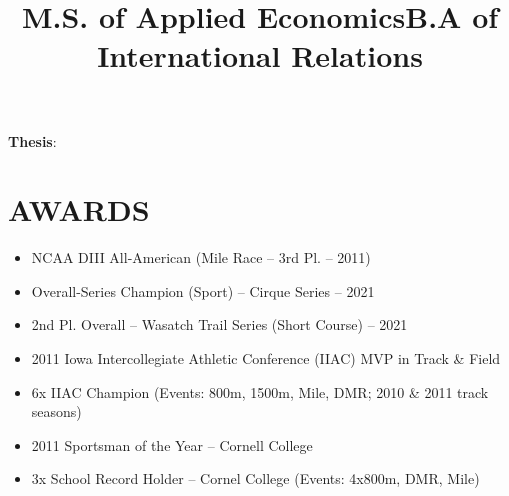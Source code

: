 \documentclass[resmargin, centered, 10pt]{../res}
\begin{document}
\begin{resume}
\title{M.S. of Applied Economics}
\begin{position}
	\textbf{Thesis}: 
\end{position}

\title{B.A of International Relations}
\begin{position}
\end{position}

\fullline

\section{AWARDS}

\begin{itemize}
    \item NCAA DIII All-American (Mile Race -- 3rd Pl. -- 2011)
	\item Overall-Series Champion (Sport) -- Cirque Series -- 2021
	\item 2nd Pl. Overall -- Wasatch Trail Series (Short Course) -- 2021
	\item 2011 Iowa Intercollegiate Athletic Conference (IIAC) MVP in Track \& Field
    \item 6x IIAC Champion (Events: 800m, 1500m, Mile, DMR; 2010 \& 2011 track seasons)
	\item 2011 Sportsman of the Year -- Cornell College
    \item 3x School Record Holder -- Cornel College (Events: 4x800m, DMR, Mile)
\end{itemize}

\end{resume}
\end{document}
